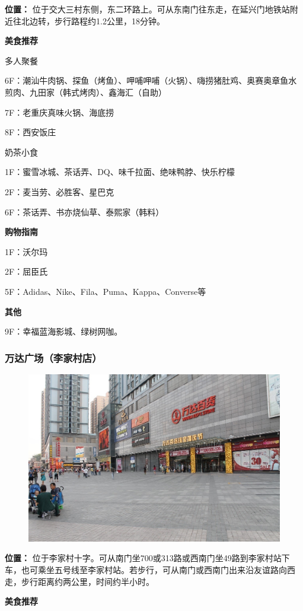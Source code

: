 \documentclass[
decoration,  %
]{qyxf-book}
\begin{document}
\textbf{位置：}
位于交大三村东侧，东二环路上。可从东南门往东走，在延兴门地铁站附近往北边转，步行路程约1.2公里，18分钟。

\textbf{美食推荐}

多人聚餐

6F：潮汕牛肉锅、探鱼（烤鱼）、呷哺呷哺（火锅）、嗨捞猪肚鸡、奥赛奥章鱼水煎肉、九田家（韩式烤肉）、鑫海汇（自助）

7F：老重庆真味火锅、海底捞

8F：西安饭庄

奶茶小食

1F：蜜雪冰城、茶话弄、DQ、味千拉面、绝味鸭脖、快乐柠檬

2F：麦当劳、必胜客、星巴克

6F：茶话弄、书亦烧仙草、泰熙家（韩料）

\textbf{购物指南}

1F：沃尔玛

2F：屈臣氏

5F：Adidas、Nike、Fila、Puma、Kappa、Converse等

\textbf{其他}

9F：幸福蓝海影城、绿树网咖。

\subsubsection{万达广场（李家村店）}

\begin{figure}[htbp]
	\centering
	\includegraphics[width=0.8\linewidth]{pics/image21.jpg}
\end{figure}

\textbf{位置：}
位于李家村十字。可从南门坐700或313路或西南门坐49路到李家村站下车，也可乘坐五号线至李家村站。若步行，可从南门或西南门出来沿友谊路向西走，步行距离约两公里，时间约半小时。


\textbf{美食推荐}
\end{document}
